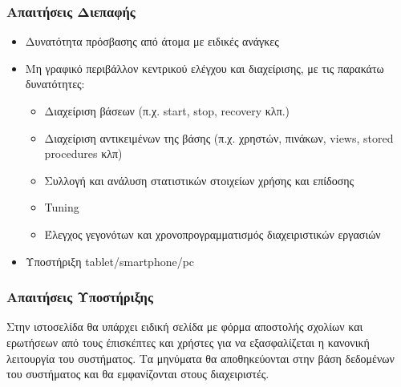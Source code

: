 \documentclass[letterpaper,6pt]{article}
\begin{document}
\subsubsection{Απαιτήσεις Διεπαφής}
\begin{itemize}
  \item Δυνατότητα πρόσβασης από άτομα με ειδικές ανάγκες
  \item Μη γραφικό περιβάλλον κεντρικού ελέγχου και διαχείρισης, με τις παρακάτω δυνατότητες:
    \begin{itemize}
      \item Διαχείριση βάσεων (π.χ. start, stop, recovery κλπ.)
      \item Διαχείριση αντικειμένων της βάσης (π.χ. χρηστών, πινάκων, views, stored procedures κλπ)
      \item Συλλογή και ανάλυση στατιστικών στοιχείων χρήσης και επίδοσης
      \item Tuning
      \item Έλεγχος γεγονότων και χρονοπρογραμματισμός διαχειριστικών εργασιών
    \end{itemize}
  \item Υποστήριξη tablet/smartphone/pc
\end{itemize}
	
\subsubsection{Απαιτήσεις Υποστήριξης}

Στην ιστοσελίδα θα υπάρχει ειδική σελίδα με φόρμα αποστολής σχολίων και ερωτήσεων από τους έπισκέπτες και χρήστες για να εξασφαλίζεται η κανονική λειτουργία του συστήματος. Τα μηνύματα θα αποθηκεύονται στην βάση δεδομένων του συστήματος και θα εμφανίζονται στους διαχειριστές.
\end{document}
